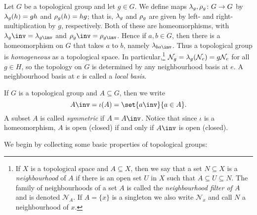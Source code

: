 \documentclass[article, a4paper, 11pt, oneside]{memoir}
\numberwithin{equation}{chapter}
\begin{document}
\newcommand{\calN}{\mathcal{N}}
\DeclarePairedDelimiter{\nhoodfilteraux}{(}{)}
\newcommand{\nhoodfilter}[1]{\calN_{#1}}

Let $G$ be a topological group and let $g \in G$. We define maps $\lambda_g, \rho_g \colon G \to G$ by $\lambda_g(h) = gh$ and $\rho_g(h) = hg$; that is, $\lambda_g$ and $\rho_g$ are given by left- and right-multiplication by $g$, respectively. Both of these are homeomorphisms, with $\leftmult_g\inv = \leftmult_{g\inv}$ and $\rightmult_g\inv = \rightmult_{g\inv}$. Hence if $a, b \in G$, then there is a homeomorphism on $G$ that takes $a$ to $b$, namely $\leftmult_{ba\inv}$. Thus a topological group is \emph{homogeneous} as a topological space. In particular,\footnote{If $X$ is a topological space and $A \subseteq X$, then we say that a set $N \subseteq X$ is a \emph{neighbourhood} of $A$ if there is an open set $U$ in $X$ such that $A \subseteq U \subseteq N$. The family of neighbourhoods of a set $A$ is called the \emph{neighbourhood filter of $A$} and is denoted $\nhoodfilter{A}$. If $A = \{x\}$ is a singleton we also write $\nhoodfilter{x}$ and call $N$ a neighbourhood of $x$.} $\nhoodfilter{g} = \leftmult_g(\nhoodfilter{e}) = g\nhoodfilter{e}$ for all $g \in H$, so the topology on $G$ is determined by any neighbourhood basis at $e$. A neighbourhood basis at $e$ is called a \emph{local basis}.

If $G$ is a topological group and $A \subseteq G$, then we write
%
\begin{equation*}
    A\inv = \iota(A) = \set{a\inv}{a \in A}.
\end{equation*}
%
A subset $A$ is called \emph{symmetric} if $A = A\inv$. Notice that since $\iota$ is a homeomorphism, $A$ is open (closed) if and only if $A\inv$ is open (closed).

We begin by collecting some basic properties of topological groups:
\end{document}
